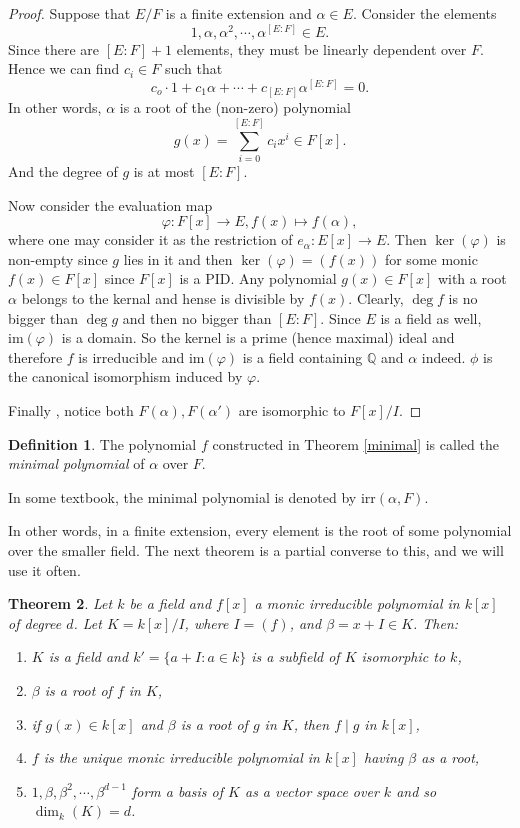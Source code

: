 \documentclass[12pt]{report}
\newtheorem{thm}{Theorem}[section]
\theoremstyle{definition}
\newtheorem{defn}[thm]{Definition}
\def\QQ{\mathbb{Q}}
\def\im{\text{im}}
\def\aa{\alpha}
\begin{document}
\begin{proof}
    Suppose that $E/F$ is a finite extension and $\aa\in E$. Consider the elements $$1,\aa,\aa^2,\cdots,\aa^{[E:F]}\in E.$$
    Since there are $[E:F]+1$ elements, they must be linearly dependent over $F$. Hence we can find $c_i\in F$ such that $$c_o\cdot 1+c_1\aa+\cdots+c_{[E:F]}\aa^{[E:F]} =0.$$  In other words, $\aa$ is a root of the (non-zero) polynomial $$g(x)=\sum_{i=0}^{[E:F]}c_i x^i \in F[x].$$ And the degree of $g$ is at most $[E:F]$.

    Now consider the evaluation map $$\varphi: F[x]\to E, f(x)\mapsto f(\aa),$$ where one may consider it as the restriction of $e_\aa: E[x]\to E$. Then $\ker(\varphi)$ is non-empty since $g$ lies in it and then $\ker(\varphi)=(f(x))$ for some monic $f(x)\in F[x]$ since $F[x]$ is a PID. Any polynomial $g(x)\in F[x]$ with a root $\aa$ belongs to the kernal and hense is divisible by $f(x)$. Clearly, $\deg f$ is no bigger than $\deg g$ and then no bigger than $[E:F]$. Since $E$ is a field as well, $\im(\varphi)$ is a domain. So the kernel is a prime (hence maximal) ideal and therefore $f$ is irreducible and $\im(\varphi)$ is a field containing $\QQ$ and $\aa$ indeed. $\phi$ is the canonical isomorphism  induced by $\varphi$. 

    Finally , notice both $F(\aa), F(\aa')$ are isomorphic to $F[x]/I$.
\end{proof}

\begin{defn}
    The polynomial $f$ constructed in Theorem \ref{minimal} is called the \emph{minimal polynomial} of $\aa$ over $F$.
\end{defn}

\begin{remark}
    In some textbook, the minimal polynomial is denoted by $\mbox{irr}(\aa,F)$.
\end{remark}

In other words, in a finite extension, every element is the root of some polynomial over the smaller field. The next theorem is a partial converse to this, and we will use it often.

\begin{thm}\label{stem}
    Let $k$ be a field and $f[x]$ a monic irreducible polynomial in $k[x]$ of degree $d$. Let $K=k[x]/I$, where $I=(f)$, and $\beta = x+I\in K$. Then:
    \begin{enumerate}
        \item $K$ is a field and $k'=\{a+I: a\in k\}$ is a subfield of $K$ isomorphic to $k$,
        \item $\beta$ is a root of $f$ in $K$,
        \item if $g(x)\in k[x]$ and $\beta$ is a root of $g$ in $K$, then $f\mid g$ in $k[x]$,
        \item $f$ is the unique monic irreducible polynomial in $k[x]$ having $\beta$ as a root,
        \item $1,\beta,\beta^2,\cdots,\beta^{d-1}$ form a basis of $K$ as a vector space over $k$ and so $\dim_k(K)=d$.
    \end{enumerate}
\end{thm}
\end{document}
